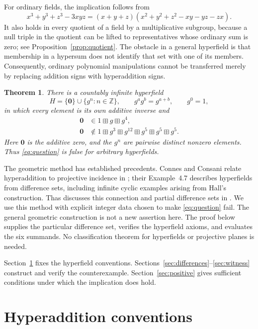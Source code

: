 \documentclass[11pt]{article}
\newtheorem{theorem}{Theorem}[section]
\theoremstyle{remark}
\newcommand{\Z}{\mathbb Z}
\newcommand{\hz}{\mathbf 0}
\newcommand{\hs}{\boxplus}
\begin{document}
For ordinary fields, the implication follows from
\begin{equation}\label{eq:field-identity}
 x^3+y^3+z^3-3xyz
 =(x+y+z)(x^2+y^2+z^2-xy-yz-zx).
\end{equation}
It also holds in every quotient of a field by a multiplicative subgroup,
because a null triple in the quotient can be lifted to representatives
whose ordinary sum is zero; see Proposition~\ref{prop:quotient}.
The obstacle in a general hyperfield is that membership in a hypersum
does not identify that set with one of its members. Consequently,
ordinary polynomial manipulations cannot be transferred merely by
replacing addition signs with hyperaddition signs.

\begin{theorem}\label{thm:main}
There is a countably infinite hyperfield
\[
 H=\{\hz\}\cup\{g^n:n\in\Z\},\qquad
 g^ag^b=g^{a+b},\qquad g^0=1,
\]
in which every element is its own additive inverse and
\begin{align}
 \hz&\in 1\hs g\hs g^4,\label{eq:witness-premise}\\
 \hz&\notin 1\hs g^3\hs g^{12}\hs g^5\hs g^5\hs g^5.
 \label{eq:witness-failure}
\end{align}
Here $\hz$ is the additive zero, and the $g^n$ are pairwise distinct
nonzero elements. Thus \eqref{eq:question} is false for arbitrary
hyperfields.
\end{theorem}

The geometric method has established precedents. Connes and Consani
relate hyperaddition to projective incidence in
\cite[Proposition~3.1 and Lemma~3.5]{CC}; their
Example~4.7 describes hyperfields from difference sets, including
infinite cyclic examples arising from Hall's construction.
Thas discusses this connection and partial difference sets in
\cite[Sections~2.2--2.3 and 4.1]{Thas}.
We use this method with explicit integer data chosen to make
\eqref{eq:question} fail. The general geometric construction is not a
new assertion here. The proof below supplies the particular difference
set, verifies the hyperfield axioms, and evaluates the six summands.
No classification theorem for hyperfields or projective planes is needed.

Section~\ref{sec:conventions} fixes the hyperfield conventions.
Sections~\ref{sec:differences}--\ref{sec:witness} construct and verify the
counterexample. Section~\ref{sec:positive} gives sufficient conditions
under which the implication does hold.

\section{Hyperaddition conventions}\label{sec:conventions}
\end{document}
